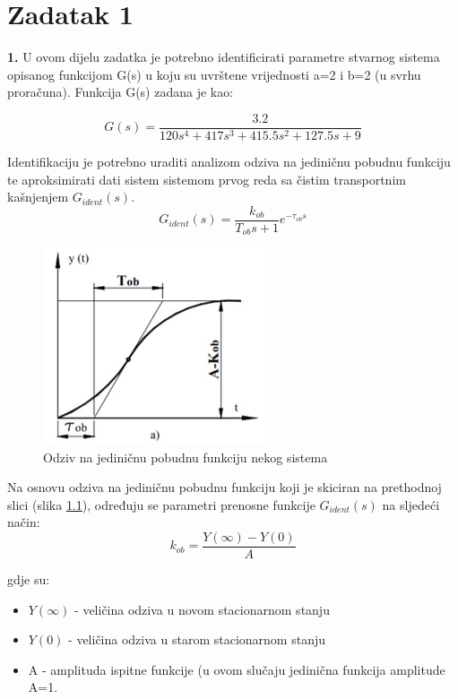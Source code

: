 \chapter{Zadatak 1}

\textbf{1.} U ovom dijelu zadatka je potrebno identificirati parametre stvarnog sistema opisanog funkcijom G(s) u koju su uvrštene vrijednosti a=2 i b=2 (u svrhu proračuna). Funkcija G(s) zadana je kao:

	\[ G(s)=\frac{3.2}{120s^4+417s^3+415.5s^2+127.5s+9} \]


Identifikaciju je potrebno uraditi analizom odziva na jediničnu pobudnu funkciju te aproksimirati dati sistem sistemom prvog reda sa čistim transportnim kašnjenjem $G_{ident} (s)$.
	\[G_{ident} (s)=\frac{k_{ob}}{T_{ob} s+1} e^{-\tau_{ob} s} \]


\begin{figure} [H]
  \centering
  \includegraphics[width=0.6\textwidth]{z1_1}
  \caption{Odziv na jediničnu pobudnu funkciju nekog sistema}
  \label{fig:z1_1}
\end{figure}



Na osnovu odziva na jediničnu pobudnu funkciju koji je skiciran na prethodnoj slici (slika \ref{fig:z1_1}), određuju se parametri prenosne funkcije $G_{ident} (s)$ na sljedeći način:
	\[k_{ob}=\frac{Y(\infty)-Y(0)}{A} \]


gdje su: 
\begin{itemize}
    \item $Y(\infty)$ - veličina odziva u novom stacionarnom stanju
    \item $Y(0)$ - veličina odziva u starom stacionarnom stanju
    \item A - amplituda ispitne funkcije (u ovom slučaju jedinična funkcija amplitude A=1.
\end{itemize}
	  
